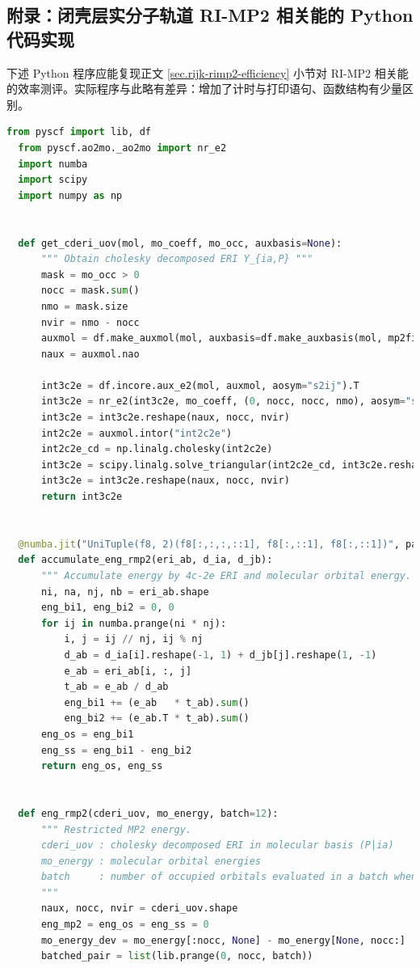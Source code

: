 \newpage

\subsection{附录：闭壳层实分子轨道 RI-MP2 相关能的 Python 代码实现}
\label{sec.python-ri-mp2}

下述 Python 程序应能复现正文 \ref{sec.rijk-rimp2-efficiency} 小节对 RI-MP2 相关能的效率测评。实际程序与此略有差异：增加了计时与打印语句、函数结构有少量区别。

\begin{lstlisting}[language=Python]
  from pyscf import lib, df
  from pyscf.ao2mo._ao2mo import nr_e2
  import numba
  import scipy
  import numpy as np
  
  
  def get_cderi_uov(mol, mo_coeff, mo_occ, auxbasis=None):
      """ Obtain cholesky decomposed ERI Y_{ia,P} """
      mask = mo_occ > 0
      nocc = mask.sum()
      nmo = mask.size
      nvir = nmo - nocc
      auxmol = df.make_auxmol(mol, auxbasis=df.make_auxbasis(mol, mp2fit=True)).build()
      naux = auxmol.nao
      
      int3c2e = df.incore.aux_e2(mol, auxmol, aosym="s2ij").T
      int3c2e = nr_e2(int3c2e, mo_coeff, (0, nocc, nocc, nmo), aosym="s2", mosym="s1")
      int3c2e = int3c2e.reshape(naux, nocc, nvir)
      int2c2e = auxmol.intor("int2c2e")
      int2c2e_cd = np.linalg.cholesky(int2c2e)
      int3c2e = scipy.linalg.solve_triangular(int2c2e_cd, int3c2e.reshape(naux, -1), lower=True)
      int3c2e = int3c2e.reshape(naux, nocc, nvir)
      return int3c2e
  
  
  @numba.jit("UniTuple(f8, 2)(f8[:,:,:,::1], f8[:,::1], f8[:,::1])", parallel=True, nopython=True)
  def accumulate_eng_rmp2(eri_ab, d_ia, d_jb):
      """ Accumulate energy by 4c-2e ERI and molecular orbital energy. """
      ni, na, nj, nb = eri_ab.shape
      eng_bi1, eng_bi2 = 0, 0
      for ij in numba.prange(ni * nj):
          i, j = ij // nj, ij % nj
          d_ab = d_ia[i].reshape(-1, 1) + d_jb[j].reshape(1, -1)
          e_ab = eri_ab[i, :, j]
          t_ab = e_ab / d_ab
          eng_bi1 += (e_ab   * t_ab).sum()
          eng_bi2 += (e_ab.T * t_ab).sum()
      eng_os = eng_bi1
      eng_ss = eng_bi1 - eng_bi2
      return eng_os, eng_ss
  
  
  def eng_rmp2(cderi_uov, mo_energy, batch=12):
      """ Restricted MP2 energy.
      cderi_uov : cholesky decomposed ERI in molecular basis (P|ia)
      mo_energy : molecular orbital energies
      batch     : number of occupied orbitals evaluated in a batch when energy accumulation
      """
      naux, nocc, nvir = cderi_uov.shape
      eng_mp2 = eng_os = eng_ss = 0
      mo_energy_dev = mo_energy[:nocc, None] - mo_energy[None, nocc:]
      batched_pair = list(lib.prange(0, nocc, batch))
      

\end{lstlisting}
